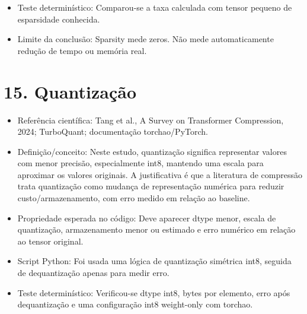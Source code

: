 \begin{itemize}
\item Teste determinístico:
Comparou-se a taxa calculada com tensor pequeno de esparsidade conhecida.
\end{itemize}

\begin{itemize}
\item Limite da conclusão:
Sparsity mede zeros. Não mede automaticamente redução de tempo ou memória real.
\end{itemize}



\section{15. Quantização}


\begin{itemize}
\item Referência científica:
Tang et al., A Survey on Transformer Compression, 2024; TurboQuant;
documentação torchao/PyTorch.
\end{itemize}

\begin{itemize}
\item Definição/conceito:
Neste estudo, quantização significa representar valores com menor precisão,
especialmente int8, mantendo uma escala para aproximar os valores originais. A
justificativa é que a literatura de compressão trata quantização como mudança
de representação numérica para reduzir custo/armazenamento, com erro medido em
relação ao baseline.
\end{itemize}

\begin{itemize}
\item Propriedade esperada no código:
Deve aparecer dtype menor, escala de quantização, armazenamento menor ou
estimado e erro numérico em relação ao tensor original.
\end{itemize}

\begin{itemize}
\item Script Python:
Foi usada uma lógica de quantização simétrica int8, seguida de dequantização
apenas para medir erro.
\end{itemize}

\begin{itemize}
\item Teste determinístico:
Verificou-se dtype int8, bytes por elemento, erro após dequantização e uma
configuração int8 weight-only com torchao.
\end{itemize}

